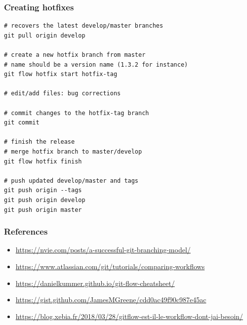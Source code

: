 \documentclass{beamer}
\begin{document}
\begin{frame}[fragile]
\frametitle{Creating hotfixes}
\begin{lstlisting}
# recovers the latest develop/master branches
git pull origin develop

# create a new hotfix branch from master
# name should be a version name (1.3.2 for instance)
git flow hotfix start hotfix-tag

# edit/add files: bug corrections

# commit changes to the hotfix-tag branch
git commit 

# finish the release
# merge hotfix branch to master/develop
git flow hotfix finish

# push updated develop/master and tags
git push origin --tags
git push origin develop
git push origin master
\end{lstlisting}
\end{frame}

\begin{frame}
\frametitle{References} %

\begin{itemize}
    \item \url{https://nvie.com/posts/a-successful-git-branching-model/}
    \item \url{https://www.atlassian.com/git/tutorials/comparing-workflows}
    \item \url{https://danielkummer.github.io/git-flow-cheatsheet/}
    \item \url{https://gist.github.com/JamesMGreene/cdd0ac49f90c987e45ac}
    \item \url{https://blog.xebia.fr/2018/03/28/gitflow-est-il-le-workflow-dont-jai-besoin/}
\end{itemize}

\end{frame}
\end{document}
